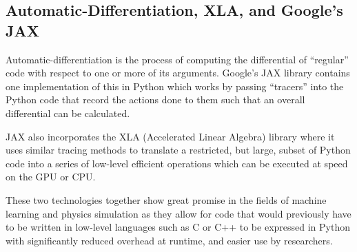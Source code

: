 \subsection{Automatic-Differentiation, XLA, and Google's JAX}
\label{sec:intro-autodiff}

Automatic-differentiation is the process of computing the differential of \enquote{regular} code with respect to one or more of its arguments. Google's JAX library \cite{jax2018github} contains one implementation of this in Python which works by passing \enquote{tracers} into the Python code that record the actions done to them such that an overall differential can be calculated.

JAX also incorporates the XLA (Accelerated Linear Algebra) library \cite{openxla-xla} where it uses similar tracing methods to translate a restricted, but large, subset of Python code into a series of low-level efficient operations which can be executed at speed on the GPU or CPU.

These two technologies together show great promise in the fields of machine learning and physics simulation as they allow for code that would previously have to be written in low-level languages such as C or C++ to be expressed in Python with significantly reduced overhead at runtime, and easier use by researchers.
